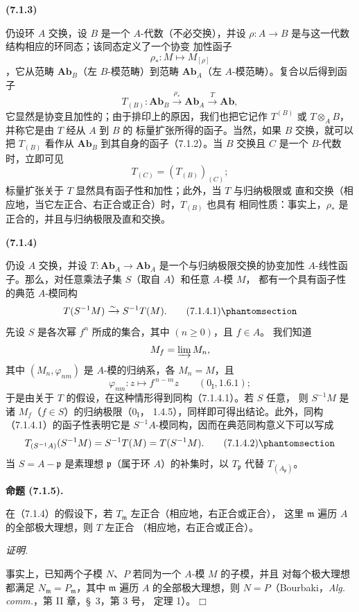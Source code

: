 \documentclass[UTF8,fontset=none,11pt,oneside,openany]{ctexbook}
\providecommand{\square}{\mdlgwhtsquare}
\newenvironment{env}[1][]{%
  \par\medskip\noindent\textbf{(#1)}\ %
}{\par}
\newenvironment{proposition}[1][]{%
  \par\medskip\noindent\textbf{命题 (#1).}\ %
}{\par}
\newenvironment{proof}{%
  \par\smallskip\noindent\textit{证明.}\ %
}{\hfill$\square$\par}
\newcommand{\oldpage}[2][]{%
  \hypertarget{ega-source-page-#1-#2}{}%
  \marginnote{\scriptsize\textbf{#1}~|~#2}\ignorespaces}
\let\EGAOriginalLabel\label
\renewcommand{\label}[1]{\phantomsection\EGAOriginalLabel{#1}}
\begin{document}
\begin{env}[7.1.3]
仍设环 $A$ 交换，设 $B$ 是一个 $A$-代数（不必交换），并设
$\rho:A\to B$ 是与这一代数结构相应的环同态；该同态定义了一个协变
\oldpage[III]{176}
加性函子
\[
  \rho_*:M\longmapsto M_{[\rho]}
\]
，它从范畴 $\mathbf{Ab}_B$（左 $B$-模范畴）到范畴
$\mathbf{Ab}_A$（左 $A$-模范畴）。复合以后得到函子
\[
  T_{(B)}:
  \mathbf{Ab}_B
  \xrightarrow{\rho_*}
  \mathbf{Ab}_A
  \xrightarrow{T}
  \mathbf{Ab},
\]
它显然是协变且加性的；由于排印上的原因，我们也把它记作
$T^{(B)}$ 或 $T\otimes_A B$，并称它是由 $T$ 经从 $A$ 到 $B$ 的
标量扩张所得的函子。当然，如果 $B$ 交换，就可以把 $T_{(B)}$ 看作从
$\mathbf{Ab}_B$ 到其自身的函子（7.1.2）。当 $B$ 交换且 $C$ 是一个
$B$-代数时，立即可见
\[
  T_{(C)}=(T_{(B)})_{(C)};
\]
标量扩张关于 $T$ 显然具有函子性和加性；此外，当 $T$ 与归纳极限或
直和交换（相应地，当它左正合、右正合或正合）时，$T_{(B)}$ 也具有
相同性质：事实上，$\rho_*$ 是正合的，并且与归纳极限及直和交换。
\end{env}

\begin{env}[7.1.4]
仍设 $A$ 交换，并设
$T:\mathbf{Ab}_A\to\mathbf{Ab}_A$ 是一个与归纳极限交换的协变加性
$A$-线性函子。那么，对任意乘法子集 $S$（取自 $A$）和任意 $A$-模 $M$，
都有一个具有函子性的典范 $A$-模同构
\[
  T(S^{-1}M)\xrightarrow{\sim}S^{-1}T(M).
  \tag{7.1.4.1}\label{III.7.1.4.1.fr}
\]
先设 $S$ 是各次幂 $f^n$ 所成的集合，其中 $(n\geqslant0)$，且 $f\in A$。
我们知道
\[
  M_f=\varinjlim M_n,
\]
其中 $(M_n,\varphi_{nm})$ 是 $A$-模的归纳系，各 $M_n=M$，且
\[
  \varphi_{nm}:z\longmapsto f^{\,n-m}z
  \qquad(0_{\mathrm I}, 1.6.1);
\]
于是由关于 $T$ 的假设，在这种情形得到同构（7.1.4.1）。若 $S$ 任意，
则 $S^{-1}M$ 是诸 $M_f$（$f\in S$）的归纳极限（$0_{\mathrm I}$，
1.4.5），同样即可得出结论。此外，同构（7.1.4.1）的函子性表明它是
$S^{-1}A$-模同构，因而在典范同构意义下可以写成
\[
  T_{(S^{-1}A)}(S^{-1}M)
  =
  S^{-1}T(M)
  =
  T(S^{-1}M).
  \tag{7.1.4.2}\label{III.7.1.4.2.fr}
\]
当 $S=A-\mathfrak p$ 是素理想 $\mathfrak p$（属于环 $A$）的补集时，以
$T_{\mathfrak p}$ 代替 $T_{(A_{\mathfrak p})}$。
\end{env}

\begin{proposition}[7.1.5]
在（7.1.4）的假设下，若 $T_{\mathfrak m}$ 左正合（相应地，右正合或正合），
这里 $\mathfrak m$ 遍历 $A$ 的全部极大理想，则 $T$ 左正合
（相应地，右正合或正合）。
\end{proposition}

\begin{proof}
事实上，已知两个子模 $N$、$P$ 若同为一个 $A$-模 $M$ 的子模，并且
对每个极大理想都满足 $N_{\mathfrak m}=P_{\mathfrak m}$，其中
$\mathfrak m$ 遍历 $A$ 的全部极大理想，则
$N=P$（Bourbaki，\emph{Alg. comm.}，第 II 章，\S~3，第 3 号，
定理 1）。
\end{proof}
\end{document}
